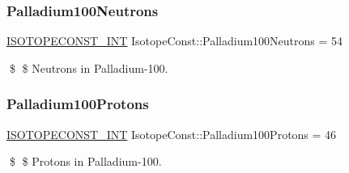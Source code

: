 \subsubsection{\texorpdfstring{Palladium100\+Neutrons}{Palladium100Neutrons}}
{\footnotesize\ttfamily \mbox{\hyperlink{group___isotope_const-_macros_ga5f18360b3e99483a35c32d789e62621c}{I\+S\+O\+T\+O\+P\+E\+C\+O\+N\+S\+T\+\_\+\+I\+NT}} Isotope\+Const\+::\+Palladium100\+Neutrons = 54}

\$ \$ Neutrons in Palladium-\/100. \mbox{\label{group___isotope_const-_palladium-_pd100_gadc59fede1338ec4030002a34d14d361d}} 
\subsubsection{\texorpdfstring{Palladium100\+Protons}{Palladium100Protons}}
{\footnotesize\ttfamily \mbox{\hyperlink{group___isotope_const-_macros_ga5f18360b3e99483a35c32d789e62621c}{I\+S\+O\+T\+O\+P\+E\+C\+O\+N\+S\+T\+\_\+\+I\+NT}} Isotope\+Const\+::\+Palladium100\+Protons = 46}

\$ \$ Protons in Palladium-\/100. 